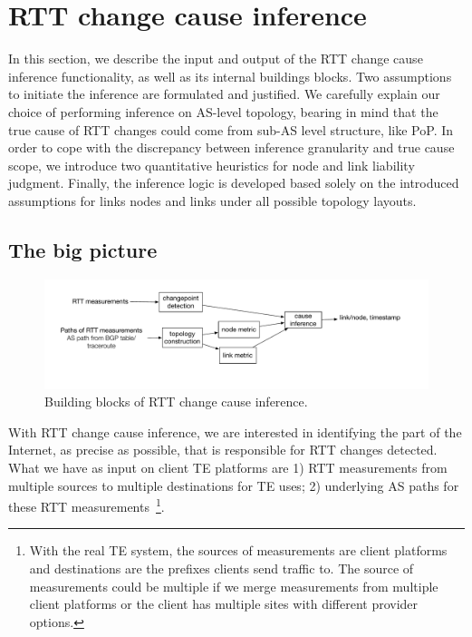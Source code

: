 \section{RTT change cause inference}
\label{sec:inference}
In this section, we describe the input and output of the RTT change cause inference functionality, as well as its internal buildings blocks. 
Two assumptions to initiate the inference are formulated and justified.
We carefully explain our choice of performing inference on AS-level topology, bearing in mind that the true cause of RTT changes could come from sub-AS level structure, like \ac{PoP}.
In order to cope with the discrepancy between inference granularity and true cause scope, we introduce two quantitative heuristics for node and link liability judgment.
Finally, the inference logic is developed based solely on the introduced assumptions for links nodes and links under all possible topology layouts.

\subsection{The big picture}

\begin{figure}[!htb]
\centering
\includegraphics[width=1.2\textwidth]{gfx/chap5/sys_design.pdf}
\caption{Building blocks of RTT change cause inference.}
\label{fig:chap5_sys_design}
\end{figure}

With RTT change cause inference, we are interested in identifying the part of the Internet, as precise as possible, that is responsible for RTT changes detected. What we have as input on client TE platforms are 1) RTT measurements from multiple sources to multiple destinations for TE uses; 2) underlying AS paths for these RTT measurements~\footnote{With the real TE system, the sources of measurements are client platforms and destinations are the prefixes clients send traffic to. The source of measurements could be multiple if we merge measurements from multiple client platforms or the client has multiple sites with different provider options.}. 

